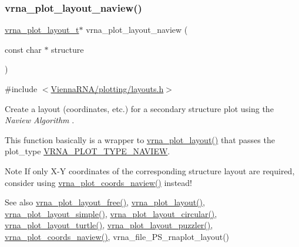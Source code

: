 \subsubsection{\texorpdfstring{vrna\_plot\_layout\_naview()}{vrna\_plot\_layout\_naview()}}
{\footnotesize\ttfamily \mbox{\hyperlink{group__plot__layout__utils_gac986fe092abc2a6a93ceb5141e4dd28b}{vrna\+\_\+plot\+\_\+layout\+\_\+t}}$\ast$ vrna\+\_\+plot\+\_\+layout\+\_\+naview (\begin{DoxyParamCaption}\item[{const char $\ast$}]{structure }\end{DoxyParamCaption})}



{\ttfamily \#include $<$\mbox{\hyperlink{layouts_8h}{Vienna\+R\+N\+A/plotting/layouts.\+h}}$>$}



Create a layout (coordinates, etc.) for a secondary structure plot using the {\itshape Naview Algorithm} \cite{bruccoleri:1988}. 

This function basically is a wrapper to \mbox{\hyperlink{group__plot__layout__utils_ga7953b759eada86c61b0a4aebe0dc67d1}{vrna\+\_\+plot\+\_\+layout()}} that passes the {\ttfamily plot\+\_\+type} \mbox{\hyperlink{group__plot__layout__utils_ga94d4c863ecac2f220f76658afb92f964}{V\+R\+N\+A\+\_\+\+P\+L\+O\+T\+\_\+\+T\+Y\+P\+E\+\_\+\+N\+A\+V\+I\+EW}}.

\begin{DoxyNote}{Note}
If only X-\/Y coordinates of the corresponding structure layout are required, consider using \mbox{\hyperlink{group__plot__layout__utils_gac0335e398d01202c77c1d7b28811b761}{vrna\+\_\+plot\+\_\+coords\+\_\+naview()}} instead!
\end{DoxyNote}
\begin{DoxySeeAlso}{See also}
\mbox{\hyperlink{group__plot__layout__utils_ga996128730020a2d7a7368b4248195931}{vrna\+\_\+plot\+\_\+layout\+\_\+free()}}, \mbox{\hyperlink{group__plot__layout__utils_ga7953b759eada86c61b0a4aebe0dc67d1}{vrna\+\_\+plot\+\_\+layout()}}, \mbox{\hyperlink{group__plot__layout__utils_ga8b09019a429c7c2447be94901c7ed658}{vrna\+\_\+plot\+\_\+layout\+\_\+simple()}}, \mbox{\hyperlink{group__plot__layout__utils_ga41d94adbd42e1a570d840756e6dd6909}{vrna\+\_\+plot\+\_\+layout\+\_\+circular()}}, \mbox{\hyperlink{group__plot__layout__utils_ga4ecd3401e22933a44bf31d14320e59b1}{vrna\+\_\+plot\+\_\+layout\+\_\+turtle()}}, \mbox{\hyperlink{group__plot__layout__utils_ga57f815d56c8c083c016381213f581f1e}{vrna\+\_\+plot\+\_\+layout\+\_\+puzzler()}}, \mbox{\hyperlink{group__plot__layout__utils_gac0335e398d01202c77c1d7b28811b761}{vrna\+\_\+plot\+\_\+coords\+\_\+naview()}}, vrna\+\_\+file\+\_\+\+P\+S\+\_\+rnaplot\+\_\+layout()
\end{DoxySeeAlso}

